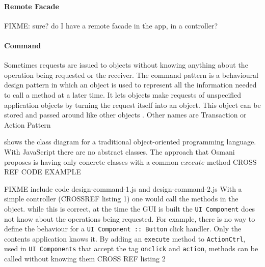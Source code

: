 \paragraph{Remote Facade} FIXME: sure? do I have a remote facade in the app, in a controller?

\paragraph{Command} 
Sometimes requests are issued to objects without knowing anything about the operation being requested or the receiver.
The command pattern is a behavioural design pattern in which an object is used to represent all the information needed to call a method at a later time. 
It lets objects make requests of unspecified application objects by turning the request itself into an object.
This object can be stored and passed around like other objects \cite{GoF:1995}.
Other names are Transaction or Action Pattern  

 shows the class diagram for a traditional object-oriented programming language.
With JavaScript there are no abstract classes.
The approach that Osmani proposes is having only concrete classes with a common $execute$ method \cite{Osmani:2012} CROSS REF CODE EXAMPLE

FIXME include code design-command-1.js and design-command-2.js
With a simple controller (CROSSREF listing 1) one would call the methods in the object.
while this is correct, at the time the \ac{GUI} is built the \texttt{UI Component} does not know about the operations being requested.
For example, there is no way to define the behaviour for a \texttt{UI Component :: Button} click handler.
Only the contents application knows it.
By adding an \texttt{execute} method to \texttt{ActionCtrl}, used in \texttt{UI Components} that accept the tag \texttt{onclick} and \texttt{action}, methods can be called without knowing them CROSS REF listing 2


